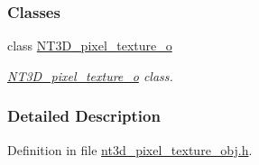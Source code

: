 \subsubsection*{Classes}
\begin{DoxyCompactItemize}
\item 
class \hyperlink{class_n_t3_d__pixel__texture__o}{NT3D\_\-pixel\_\-texture\_\-o}
\begin{DoxyCompactList}\small\item\em \hyperlink{class_n_t3_d__pixel__texture__o}{NT3D\_\-pixel\_\-texture\_\-o} class. \item\end{DoxyCompactList}\end{DoxyCompactItemize}


\subsubsection{Detailed Description}


Definition in file \hyperlink{nt3d__pixel__texture__obj_8h_source}{nt3d\_\-pixel\_\-texture\_\-obj.h}.

